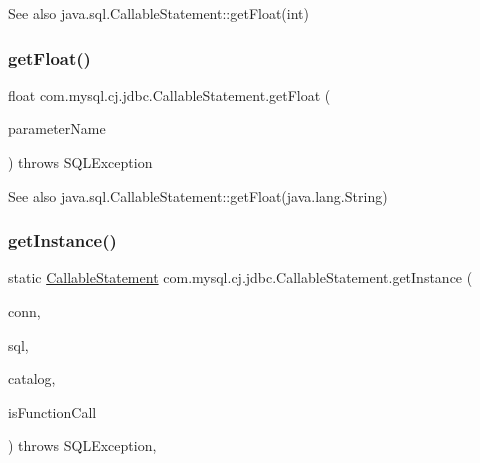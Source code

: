 \begin{DoxySeeAlso}{See also}
java.\+sql.\+Callable\+Statement\+::get\+Float(int) 
\end{DoxySeeAlso}
\mbox{\label{classcom_1_1mysql_1_1cj_1_1jdbc_1_1_callable_statement_a60fdd6135ca3dd6e54bdb7ff62175103}} 
\subsubsection{\texorpdfstring{get\+Float()}{getFloat()}\hspace{0.1cm}{\footnotesize\ttfamily [2/2]}}
{\footnotesize\ttfamily float com.\+mysql.\+cj.\+jdbc.\+Callable\+Statement.\+get\+Float (\begin{DoxyParamCaption}\item[{String}]{parameter\+Name }\end{DoxyParamCaption}) throws S\+Q\+L\+Exception}

\begin{DoxySeeAlso}{See also}
java.\+sql.\+Callable\+Statement\+::get\+Float(java.\+lang.\+String) 
\end{DoxySeeAlso}
\mbox{\label{classcom_1_1mysql_1_1cj_1_1jdbc_1_1_callable_statement_a1226691f1ed6861ed209ec30c4cabb6d}} 
\subsubsection{\texorpdfstring{get\+Instance()}{getInstance()}\hspace{0.1cm}{\footnotesize\ttfamily [1/2]}}
{\footnotesize\ttfamily static \mbox{\hyperlink{classcom_1_1mysql_1_1cj_1_1jdbc_1_1_callable_statement}{Callable\+Statement}} com.\+mysql.\+cj.\+jdbc.\+Callable\+Statement.\+get\+Instance (\begin{DoxyParamCaption}\item[{\mbox{\hyperlink{interfacecom_1_1mysql_1_1cj_1_1jdbc_1_1_jdbc_connection}{Jdbc\+Connection}}}]{conn,  }\item[{String}]{sql,  }\item[{String}]{catalog,  }\item[{boolean}]{is\+Function\+Call }\end{DoxyParamCaption}) throws S\+Q\+L\+Exception\hspace{0.3cm}{\ttfamily [static]}, {\ttfamily [protected]}}

